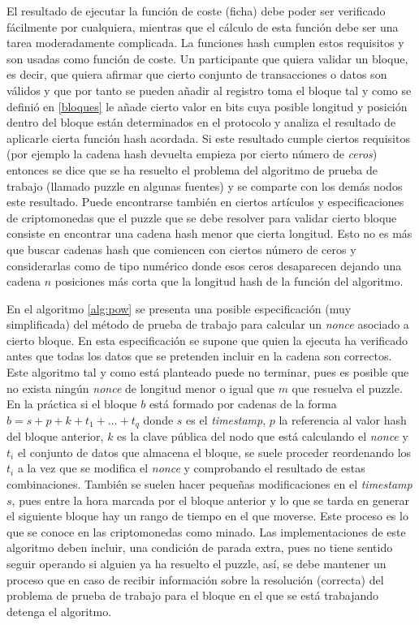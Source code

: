 El resultado de ejecutar la función de coste (ficha) debe poder ser verificado fácilmente por cualquiera, mientras que el cálculo de esta función debe ser una tarea moderadamente complicada. La funciones hash cumplen estos requisitos y son usadas como función de coste. Un participante que quiera validar un bloque, es decir, que quiera afirmar que cierto conjunto de transacciones o datos son válidos y que por tanto se pueden añadir al registro toma el bloque tal y como se definió en \ref{bloques} le añade cierto valor en bits cuya posible longitud y posición dentro del bloque están determinados en el protocolo y analiza el resultado de aplicarle cierta función hash acordada. Si este resultado cumple ciertos requisitos (por ejemplo la cadena hash devuelta empieza por cierto número de \textit{ceros}) entonces se dice que se ha resuelto el problema del algoritmo de prueba de trabajo (llamado puzzle en algunas fuentes) y se comparte con los demás nodos este resultado. Puede encontrarse también en ciertos artículos y especificaciones de criptomonedas que el puzzle que se debe resolver para validar cierto bloque consiste en encontrar una cadena hash menor que cierta longitud. Esto no es más que buscar cadenas hash que comiencen con ciertos número de ceros y considerarlas como de tipo numérico donde esos ceros desaparecen dejando una cadena $n$ posiciones más corta que la longitud hash de la función del algoritmo. 

En el algoritmo \ref{alg:pow} se presenta una posible especificación (muy simplificada) del método de prueba de trabajo para calcular un \textit{nonce} asociado a cierto bloque. En esta especificación se supone que quien la ejecuta ha verificado antes que todas los datos que se pretenden incluir en la cadena son correctos. Este algoritmo tal y como está planteado puede no terminar, pues es posible que no exista ningún \textit{nonce} de longitud menor o igual que $m$ que resuelva el puzzle. En la práctica si el bloque $b$ está formado por cadenas de la forma $b = s+p+k+t_{1}+ \ldots + t_{q}$ donde $s$ es el \textit{timestamp}, $p$ la referencia al valor hash del bloque anterior, $k$ es la clave pública del nodo que está calculando el \textit{nonce} y $t_{i}$ el conjunto de datos que almacena el bloque, se suele proceder reordenando los $t_{i}$ a la vez que se modifica el \textit{nonce} y comprobando el resultado de estas combinaciones. También se suelen hacer pequeñas modificaciones en el \textit{timestamp} $s$, pues entre la hora marcada por el bloque anterior y lo que se tarda en generar el siguiente bloque hay un rango de tiempo en el que moverse. Este proceso es lo que se conoce en las criptomonedas como minado. Las implementaciones de este algoritmo deben incluir, una condición de parada extra, pues no tiene sentido seguir operando si alguien ya ha resuelto el puzzle, así, se debe mantener un proceso que en caso de recibir información sobre la resolución (correcta) del problema de prueba de trabajo para el bloque en el que se está trabajando detenga el algoritmo. 

